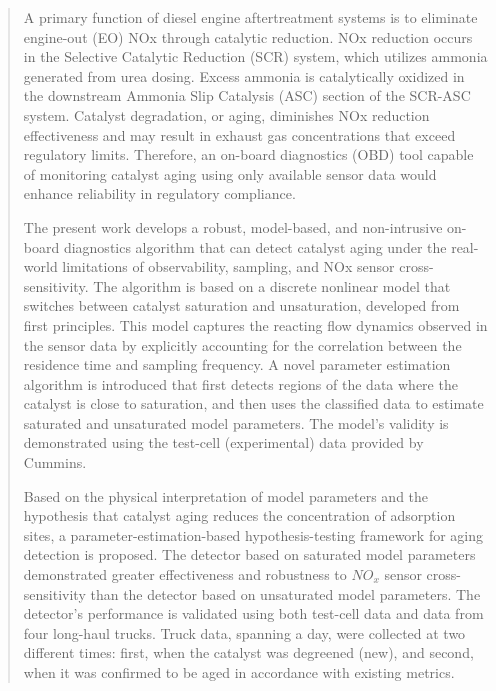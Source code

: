 \begin{abstract}%
        A primary function of diesel engine aftertreatment systems is to eliminate engine-out (EO) NOx through
        catalytic reduction. NOx reduction occurs in the Selective Catalytic Reduction (SCR) system, which utilizes
        ammonia generated from urea dosing. Excess ammonia is catalytically oxidized in the downstream Ammonia Slip
        Catalysis (ASC) section of the SCR-ASC system. Catalyst degradation, or aging, diminishes NOx reduction
        effectiveness and may result in exhaust gas concentrations that exceed regulatory limits. Therefore, an on-board
        diagnostics (OBD) tool capable of monitoring catalyst aging using only available sensor data would enhance
        reliability in regulatory compliance.

        The present work develops a robust, model-based, and non-intrusive on-board diagnostics algorithm that can
        detect catalyst aging under the real-world limitations of observability, sampling, and NOx sensor
        cross-sensitivity. The algorithm is based on a discrete nonlinear model that switches between catalyst
        saturation and unsaturation, developed from first principles. This model captures the reacting flow dynamics
        observed in the sensor data by explicitly accounting for the correlation between the residence time and sampling
        frequency. A novel parameter estimation algorithm is introduced that first detects regions of the data where the
        catalyst is close to saturation, and then uses the classified data to estimate saturated and unsaturated model
        parameters. The model's validity is demonstrated using the test-cell (experimental) data provided by Cummins.

        Based on the physical interpretation of model parameters and the hypothesis that catalyst aging reduces the
        concentration of adsorption sites, a parameter-estimation-based hypothesis-testing framework for aging detection
        is proposed. The detector based on saturated model parameters demonstrated greater effectiveness and robustness
        to $NO_x$ sensor cross-sensitivity than the detector based on unsaturated model parameters. The detector's
        performance is validated using both test-cell data and data from four long-haul trucks. Truck data, spanning a
        day, were collected at two different times: first, when the catalyst was degreened (new), and second, when it
        was confirmed to be aged in accordance with existing metrics.
\end{abstract}
